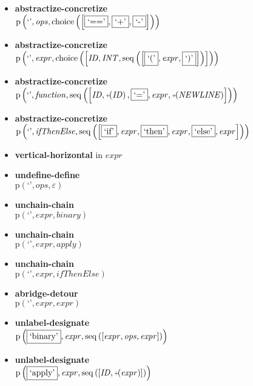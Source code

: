 {\begin{itemize}
\item \textbf{abstractize-concretize}\\$\mathrm{p}\left(\text{`'},\mathit{ops},\mathrm{choice}\left(\left[\fbox{$\text{`=='}$}, \fbox{$\text{`+'}$}, \fbox{$\text{`-'}$}\right]\right)\right)$
\item \textbf{abstractize-concretize}\\$\mathrm{p}\left(\text{`'},\mathit{expr},\mathrm{choice}\left(\left[\mathit{ID}, \mathit{INT}, \mathrm{seq}\left(\left[\fbox{$\text{`('}$}, \mathit{expr}, \fbox{$\text{`)'}$}\right]\right)\right]\right)\right)$
\item \textbf{abstractize-concretize}\\$\mathrm{p}\left(\text{`'},\mathit{function},\mathrm{seq}\left(\left[\mathit{ID}, \plus \left(\mathit{ID}\right), \fbox{$\text{`='}$}, \mathit{expr}, \plus \left(\mathit{NEWLINE}\right)\right]\right)\right)$
\item \textbf{abstractize-concretize}\\$\mathrm{p}\left(\text{`'},\mathit{ifThenElse},\mathrm{seq}\left(\left[\fbox{$\text{`if'}$}, \mathit{expr}, \fbox{$\text{`then'}$}, \mathit{expr}, \fbox{$\text{`else'}$}, \mathit{expr}\right]\right)\right)$
\item \textbf{vertical-horizontal}  in $\mathit{expr}$
\item \textbf{undefine-define}\\$\mathrm{p}\left(\text{`'},\mathit{ops},\varepsilon\right)$
\item \textbf{unchain-chain}\\$\mathrm{p}\left(\text{`'},\mathit{expr},\mathit{binary}\right)$
\item \textbf{unchain-chain}\\$\mathrm{p}\left(\text{`'},\mathit{expr},\mathit{apply}\right)$
\item \textbf{unchain-chain}\\$\mathrm{p}\left(\text{`'},\mathit{expr},\mathit{ifThenElse}\right)$
\item \textbf{abridge-detour}\\$\mathrm{p}\left(\text{`'},\mathit{expr},\mathit{expr}\right)$
\item \textbf{unlabel-designate}\\$\mathrm{p}\left(\fbox{\text{`binary'}},\mathit{expr},\mathrm{seq}\left(\left[\mathit{expr}, \mathit{ops}, \mathit{expr}\right]\right)\right)$
\item \textbf{unlabel-designate}\\$\mathrm{p}\left(\fbox{\text{`apply'}},\mathit{expr},\mathrm{seq}\left(\left[\mathit{ID}, \plus \left(\mathit{expr}\right)\right]\right)\right)$

\end{itemize}}
